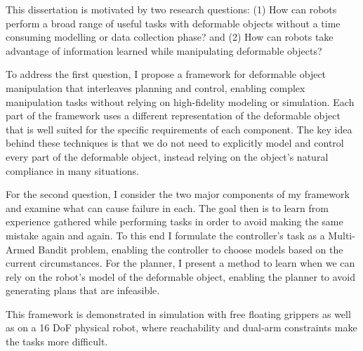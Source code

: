 This dissertation is motivated by two research questions: (1) How can robots perform a broad range of useful tasks with deformable objects without a time consuming modelling or data collection phase? and (2) How can robots take advantage of information learned while manipulating deformable objects?
        
To address the first question, I propose a framework for deformable object manipulation that interleaves planning and control, enabling complex manipulation tasks without relying on high-fidelity modeling or simulation. Each part of the framework uses a different representation of the deformable object that is well suited for the specific requirements of each component. The key idea behind these techniques is that we do not need to explicitly model and control every part of the deformable object, instead relying on the object's natural compliance in many situations. 

For the second question, I consider the two major components of my framework and examine what can cause failure in each. The goal then is to learn from experience gathered while performing tasks in order to avoid making the same mistake again and again. To this end I formulate the controller's task as a Multi-Armed Bandit problem, enabling the controller to choose models based on the current circumstances. For the planner, I present a method to learn when we can rely on the robot's model of the deformable object, enabling the planner to avoid generating plans that are infeasible.

This framework is demonstrated in simulation with free floating grippers as well as on a 16 DoF physical robot, where reachability and dual-arm constraints make the tasks more difficult.